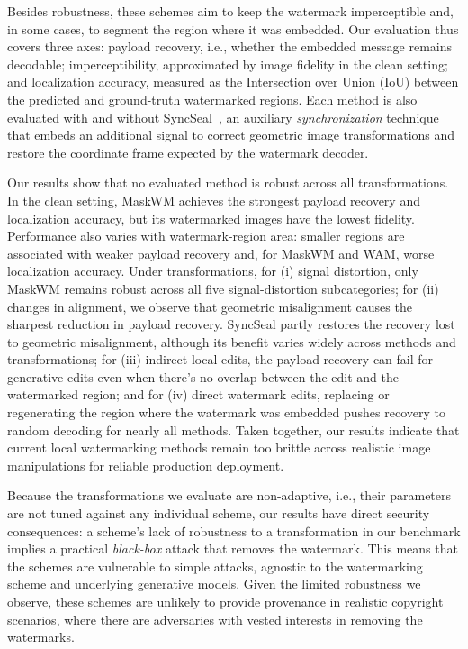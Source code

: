 \documentclass[sigconf,nonacm]{acmart}
\begin{document}
Besides robustness, these schemes aim to keep the watermark imperceptible and, in some cases, to segment the region where it was embedded.
Our evaluation thus covers three axes: payload recovery, i.e., whether the embedded message remains decodable; imperceptibility, approximated by image fidelity in the clean setting; and localization accuracy, measured as the Intersection over Union (IoU) between the predicted and ground-truth watermarked regions.
Each method is also evaluated with and without SyncSeal~\cite{syncseal}, an auxiliary {\it synchronization} technique that embeds an additional signal to correct geometric image transformations and restore the coordinate frame expected by the watermark decoder.

Our results show that no evaluated method is robust across all transformations.
In the clean setting, MaskWM achieves the strongest payload recovery and localization accuracy, but its watermarked images have the lowest fidelity.
Performance also varies with watermark-region area: smaller regions are associated with weaker payload recovery and, for MaskWM and WAM, worse localization accuracy.
Under transformations, for (i) signal distortion, only MaskWM remains robust across all five signal-distortion subcategories; for (ii) changes in alignment, we observe that geometric misalignment causes the sharpest reduction in payload recovery. SyncSeal partly restores the recovery lost to geometric misalignment, although its benefit varies widely across methods and transformations; for (iii) indirect local edits, the payload recovery can fail for generative edits even when there's no overlap between the edit and the watermarked region; and for (iv) direct watermark edits, replacing or regenerating the region where the watermark was embedded pushes recovery to random decoding for nearly all methods. Taken together, our results indicate that current local watermarking methods remain too brittle across realistic image manipulations for reliable production deployment.

Because the transformations we evaluate are non-adaptive, i.e., their parameters are not tuned against any individual scheme, our results have direct security consequences: a scheme's lack of robustness to a transformation in our benchmark implies a practical {\it black-box} attack that removes the watermark.
This means that the schemes are vulnerable to simple attacks, agnostic to the watermarking scheme and underlying generative models. Given the limited robustness we observe, these schemes are unlikely to provide provenance in realistic copyright scenarios, where there are adversaries with vested interests in removing the watermarks.
\end{document}
